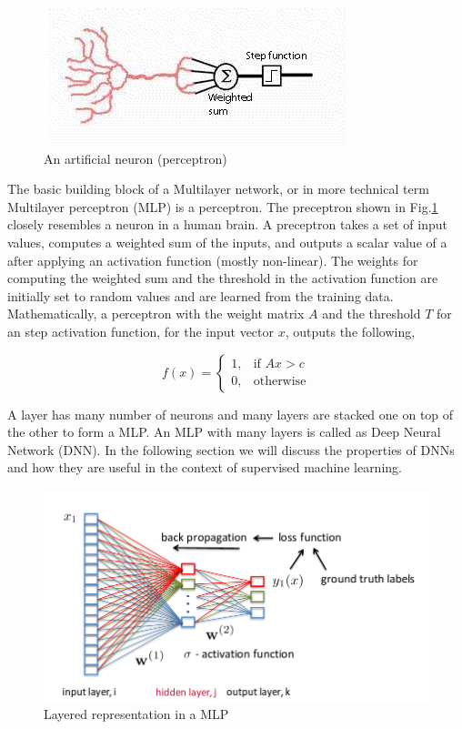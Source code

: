 \documentclass[a4paper]{article}
\begin{document}
\begin{figure}
  \includegraphics[width=.99\linewidth]{img/artificial.jpg}
  \caption{ An artificial neuron (perceptron)}
  \label{fig:ann}
\end{figure}


The basic  building block of a Multilayer  network,  or in  more  technical term
Multilayer  perceptron   (MLP)  is   a   perceptron.  The  preceptron  shown  in
Fig.\ref{fig:ann} closely  resembles  a  neuron in  a  human brain. A preceptron
takes a set of input values, computes a weighted sum of the  inputs, and outputs
a  scalar value  of a after applying an activation function (mostly non-linear).
The  weights for computing the weighted sum and the  threshold in the activation
function are initially  set to  random values  and are learned from the training
data. Mathematically, a  perceptron with the weight matrix $A$ and the threshold
$T$ for an  step activation  function, for  the  input vector  $x$,  outputs the
following,


\[
  f (x)=
  \begin{cases}
    1, & \text{if }  A x > c \\
    0, & \text{otherwise}
  \end{cases}
\]


A layer has many number of neurons and many layers are stacked one on top of the
other  to  form a MLP. An MLP  with many layers is called as Deep Neural Network
(DNN).  In the following section we  will discuss the properties of DNNs and how
they are useful in the context of supervised machine learning.


\begin{figure}
  \includegraphics[width=.99\linewidth]{img/mlp.png}
  \caption{Layered representation in a MLP}
  \label{fig:mlp}
\end{figure}
\end{document}
